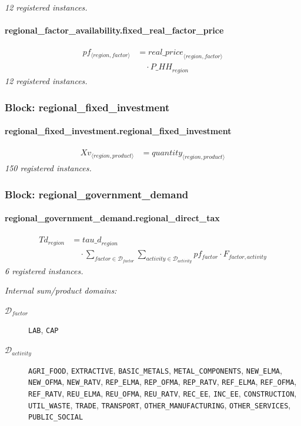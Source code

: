\documentclass[11pt]{article}
\begin{document}
\noindent\emph{12 registered instances.}\par
\paragraph{regional\_factor\_availability.fixed\_real\_factor\_price}
\begin{align*}
pf_{\langle region, factor\rangle} &= {real\_price}_{\langle region, factor\rangle}\\
&\quad {}\cdot {P\_HH}_{region}
\end{align*}
\noindent\emph{12 registered instances.}\par
\subsubsection*{Block: regional\_fixed\_investment}
\paragraph{regional\_fixed\_investment.regional\_fixed\_investment}
\begin{align*}
Xv_{\langle region, product\rangle} &= quantity_{\langle region, product\rangle}
\end{align*}
\noindent\emph{150 registered instances.}\par
\subsubsection*{Block: regional\_government\_demand}
\paragraph{regional\_government\_demand.regional\_direct\_tax}
\begin{align*}
Td_{region} &= {tau\_d}_{region}\\
&\quad {}\cdot \sum_{factor \in \mathcal{D}_{factor}} \sum_{activity \in \mathcal{D}_{activity}} pf_{factor} \cdot F_{factor,activity}
\end{align*}
\noindent\emph{6 registered instances.}\par
\noindent\emph{Internal sum/product domains:}\par
\begin{description}
\item[\(\mathcal{D}_{factor}\)] \texttt{LAB}, \texttt{CAP}
\item[\(\mathcal{D}_{activity}\)] \texttt{AGRI\_FOOD}, \texttt{EXTRACTIVE}, \texttt{BASIC\_METALS}, \texttt{METAL\_COMPONENTS}, \texttt{NEW\_ELMA}, \texttt{NEW\_OFMA}, \texttt{NEW\_RATV}, \texttt{REP\_ELMA}, \texttt{REP\_OFMA}, \texttt{REP\_RATV}, \texttt{REF\_ELMA}, \texttt{REF\_OFMA}, \texttt{REF\_RATV}, \texttt{REU\_ELMA}, \texttt{REU\_OFMA}, \texttt{REU\_RATV}, \texttt{REC\_EE}, \texttt{INC\_EE}, \texttt{CONSTRUCTION}, \texttt{UTIL\_WASTE}, \texttt{TRADE}, \texttt{TRANSPORT}, \texttt{OTHER\_MANUFACTURING}, \texttt{OTHER\_SERVICES}, \texttt{PUBLIC\_SOCIAL}
\end{description}
\end{document}
